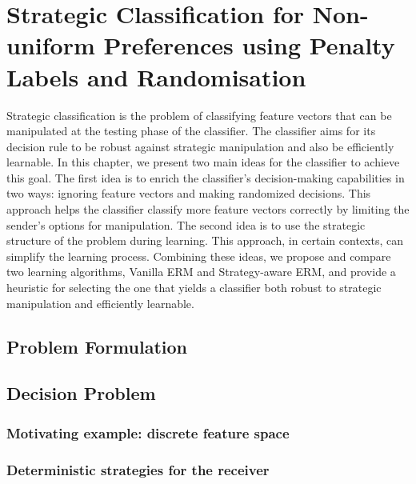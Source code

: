 \chapter{Strategic Classification for Non-uniform Preferences using Penalty Labels and Randomisation}
\label{ch:strat_class}

Strategic classification is the problem of classifying feature vectors that can be manipulated at the testing phase of the classifier. The classifier aims for its decision rule to be robust against strategic manipulation and also be efficiently learnable. In this chapter, we present two main ideas for the classifier to achieve this goal. The first idea is to enrich the classifier's decision-making capabilities in two ways: ignoring feature vectors and making randomized decisions. This approach helps the classifier classify more feature vectors correctly by limiting the sender's options for manipulation. The second idea is to use the strategic structure of the problem during learning. This approach, in certain contexts, can simplify the learning process. Combining these ideas, we propose and compare two learning algorithms, Vanilla ERM and Strategy-aware ERM, and provide a heuristic for selecting the one that yields a classifier both robust to strategic manipulation and efficiently learnable.



\section{Problem Formulation}\label{sec:Problem formulation}


\section{Decision Problem}\label{sec:Decision problem}


\subsection{Motivating example: discrete feature space}\label{subsec:Discrete feature space}


\subsection{Deterministic strategies for the receiver}\label{subsec:Deterministic strategy}


